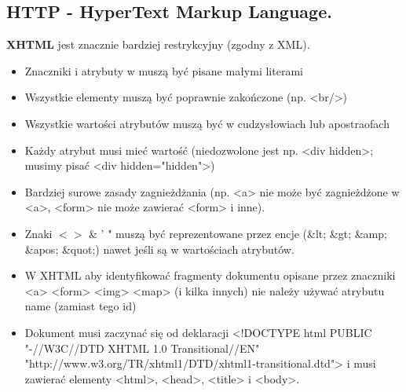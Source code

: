 \documentclass[../main.tex]{subfiles}
\begin{document}
    \subsection{HTTP - HyperText Markup Language.}

    \textbf{XHTML} jest znacznie bardziej restrykcyjny (zgodny z XML).
    \begin{itemize}
        \item Znaczniki i atrybuty w muszą być pisane małymi literami
        \item Wszystkie elementy muszą być poprawnie zakończone (np. <br/>)
        \item Wszystkie wartości atrybutów muszą być w cudzysłowiach lub apostraofach
        \item Każdy atrybut musi mieć wartość (niedozwolone jest np. <div hidden>; musimy pisać <div hidden="hidden">)
        \item Bardziej surowe zasady zagnieżdżania (np. <a> nie może być zagnieżdżone w <a>, <form> nie może zawierać <form> i inne).
        \item Znaki $< >$ \& ' " muszą być reprezentowane przez encje (\&lt; \&gt; \&amp; \&apos; \&quot;) nawet jeśli są w wartościach atrybutów.
        \item W XHTML aby identyfikować fragmenty dokumentu opisane przez znaczniki <a> <form> <img> <map> (i kilka innych) nie należy używać atrybutu name (zamiast tego id)
        \item Dokument musi zaczynać się od deklaracji <!DOCTYPE html PUBLIC "-//W3C//DTD XHTML 1.0 Transitional//EN"
        "http://www.w3.org/TR/xhtml1/DTD/xhtml1-transitional.dtd">
        i musi zawierać elementy <html>, <head>, <title> i <body>.
    \end{itemize}
\end{document}
